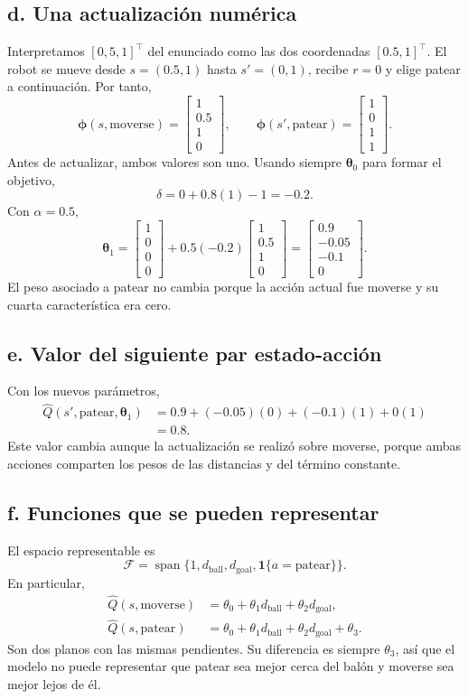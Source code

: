 \documentclass[11pt,a4paper]{article}
\newcommand{\indic}{\mathbf{1}}
\newcommand{\apartado}[1]{\subsection*{#1}}
\begin{document}
\apartado{d. Una actualización numérica}
Interpretamos $[0,5,1]^\top$ del enunciado como las dos coordenadas $[0.5,1]^\top$. El robot se mueve desde $s=(0.5,1)$ hasta $s'=(0,1)$, recibe $r=0$ y elige patear a continuación. Por tanto,
\[
\boldsymbol\phi(s,\text{moverse})=
\begin{bmatrix}1\\0.5\\1\\0\end{bmatrix},\qquad
\boldsymbol\phi(s',\text{patear})=
\begin{bmatrix}1\\0\\1\\1\end{bmatrix}.
\]
Antes de actualizar, ambos valores son uno. Usando siempre $\boldsymbol\theta_0$ para formar el objetivo,
\[
\delta=0+0.8(1)-1=-0.2.
\]
Con $\alpha=0.5$,
\[
\boldsymbol\theta_1=
\begin{bmatrix}1\\0\\0\\0\end{bmatrix}
+0.5(-0.2)\begin{bmatrix}1\\0.5\\1\\0\end{bmatrix}
=\boxed{\begin{bmatrix}0.9\\-0.05\\-0.1\\0\end{bmatrix}.}
\]
El peso asociado a patear no cambia porque la acción actual fue moverse y su cuarta característica era cero.

\apartado{e. Valor del siguiente par estado-acción}
Con los nuevos parámetros,
\begin{align*}
\widehat Q(s',\text{patear},\boldsymbol\theta_1)
&=0.9+(-0.05)(0)+(-0.1)(1)+0(1)\\
&=\boxed{0.8}.
\end{align*}
Este valor cambia aunque la actualización se realizó sobre moverse, porque ambas acciones comparten los pesos de las distancias y del término constante.

\apartado{f. Funciones que se pueden representar}
El espacio representable es
\[
\mathcal F=\operatorname{span}\{1,d_{\mathrm{ball}},d_{\mathrm{goal}},\indic\{a=\text{patear}\}\}.
\]
En particular,
\begin{align*}
\widehat Q(s,\text{moverse})&=\theta_0+\theta_1d_{\mathrm{ball}}+\theta_2d_{\mathrm{goal}},\\
\widehat Q(s,\text{patear})&=\theta_0+\theta_1d_{\mathrm{ball}}+\theta_2d_{\mathrm{goal}}+\theta_3.
\end{align*}
Son dos planos con las mismas pendientes. Su diferencia es siempre $\theta_3$, así que el modelo no puede representar que patear sea mejor cerca del balón y moverse sea mejor lejos de él.
\end{document}

